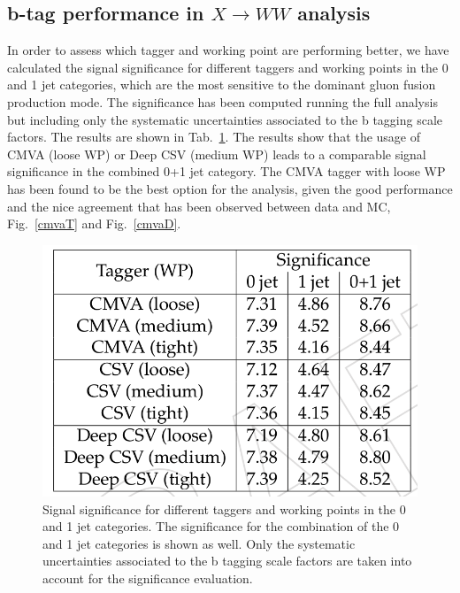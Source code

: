 \subsection*{b-tag performance in $X \to WW$ analysis}
In order to assess which tagger and working point are performing better, we have calculated
the signal significance for different taggers and working points in the 0 and 1 jet categories,
which are the most sensitive to the dominant gluon fusion production mode. The significance
has been computed running the full analysis but including only the systematic uncertainties
associated to the b tagging scale factors. The results are shown in Tab.~\ref{btt}.
The results show that the usage of CMVA (loose WP) or Deep CSV (medium WP) leads to a
comparable signal significance in the combined 0+1 jet category. The CMVA tagger with loose
WP has been found to be the best option for the analysis, given the good performance and the
nice agreement that has been observed between data and MC, Fig.~\ref{cmvaT} and  Fig.~\ref{cmvaD}.
\begin{figure}
\centering
\includegraphics[scale= 0.3]{../Cap4/btt}
\caption{Signal significance for different taggers and working points in the 0 and 1 jet categories. The significance for the combination of the 0 and 1 jet categories is shown as well. Only
the systematic uncertainties associated to the b tagging scale factors are taken into account for
the significance evaluation.}
\label{btt}
\end{figure}

